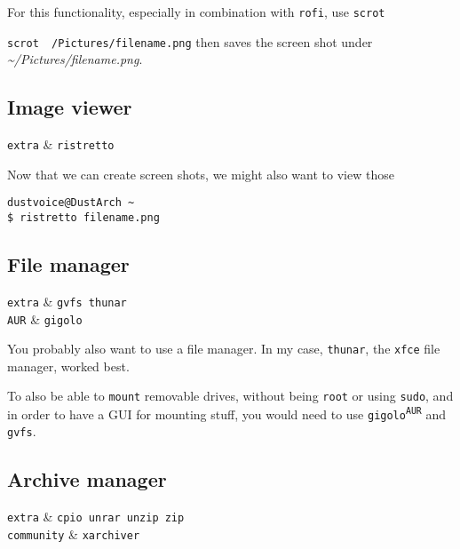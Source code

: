 \documentclass[10pt]{dustdoc}
\begin{document}
For this functionality, especially in combination with \texttt{rofi}, use \texttt{scrot}

\texttt{scrot ~/Pictures/filename.png} then saves the screen shot under \textit{\~{}/Pictures/filename.png}.

\subsection{Image viewer}
\label{sec:image-viewer}

\begin{packagetable}
    \texttt{extra} & \texttt{ristretto} \\
\end{packagetable}

Now that we can create screen shots, we might also want to view those

\begin{verbatim}
dustvoice@DustArch ~
$ ristretto filename.png
\end{verbatim}

\subsection{File manager}
\label{sec:file-manager}

\begin{packagetable}
    \texttt{extra} & \texttt{gvfs thunar} \\
    \texttt{AUR} & \texttt{gigolo} \\
\end{packagetable}

You probably also want to use a file manager.
In my case, \texttt{thunar}, the \texttt{xfce} file manager, worked best.

To also be able to \texttt{mount} removable drives, without being \texttt{root} or using \texttt{sudo}, and in order to have a GUI for mounting stuff, you would need to use \texttt{gigolo\textsuperscript{\texttt{AUR}}} and \texttt{gvfs}.

\subsection{Archive manager}
\label{sec:archive-manager}

\begin{packagetable}
    \texttt{extra} & \texttt{cpio unrar unzip zip} \\
    \texttt{community} & \texttt{xarchiver} \\
\end{packagetable}
\end{document}
